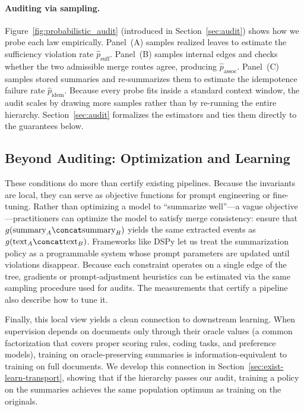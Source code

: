 \paragraph{Auditing via sampling.}
Figure~\ref{fig:probabilistic_audit} (introduced in Section~\ref{sec:audit}) shows how we probe each law empirically. Panel~(A) samples realized leaves to estimate the sufficiency violation rate $\hat{p}_{\text{suff}}$. Panel~(B) samples internal edges and checks whether the two admissible merge routes agree, producing $\hat{p}_{\text{assoc}}$. Panel~(C) samples stored summaries and re-summarizes them to estimate the idempotence failure rate $\hat{p}_{\text{idem}}$. Because every probe fits inside a standard context window, the audit scales by drawing more samples rather than by re-running the entire hierarchy. Section~\ref{sec:audit} formalizes the estimators and ties them directly to the guarantees below.

\subsection{Beyond Auditing: Optimization and Learning}

These conditions do more than certify existing pipelines. Because the invariants are local, they can serve as objective functions for prompt engineering or fine-tuning. Rather than optimizing a model to ``summarize well''---a vague objective---practitioners can optimize the model to satisfy merge consistency: ensure that $g(\text{summary}_A \concat \text{summary}_B)$ yields the same extracted events as $g(\text{text}_A \concat \text{text}_B)$. Frameworks like DSPy \citep{khattab2024dspy} let us treat the summarization policy as a programmable system whose prompt parameters are updated until violations disappear. Because each constraint operates on a single edge of the tree, gradients or prompt-adjustment heuristics can be estimated via the same sampling procedure used for audits. The measurements that certify a pipeline also describe how to tune it.

Finally, this local view yields a clean connection to downstream learning. When supervision depends on documents only through their oracle values (a common factorization that covers proper scoring rules, coding tasks, and preference models), training on oracle-preserving summaries is information-equivalent to training on full documents. We develop this connection in Section~\ref{sec:exist-learn-transport}, showing that if the hierarchy passes our audit, training a policy on the summaries achieves the same population optimum as training on the originals.


